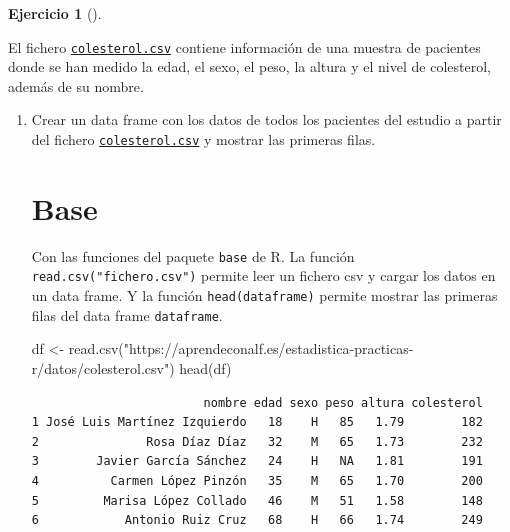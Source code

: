 \documentclass[
  spanish,
  a4paper,
]{scrreport}
\newenvironment{Shaded}{\begin{snugshade}}{\end{snugshade}}
\newcommand{\FunctionTok}[1]{\textcolor[rgb]{0.28,0.35,0.67}{#1}}
\newcommand{\NormalTok}[1]{\textcolor[rgb]{0.00,0.23,0.31}{#1}}
\newcommand{\OtherTok}[1]{\textcolor[rgb]{0.00,0.23,0.31}{#1}}
\newcommand{\StringTok}[1]{\textcolor[rgb]{0.13,0.47,0.30}{#1}}
\theoremstyle{definition}
\newtheorem{exercise}{Ejercicio}[chapter]
\theoremstyle{remark}
\begin{document}
\begin{exercise}[]\protect\hypertarget{exr-dataframes-2}{}\label{exr-dataframes-2}

El fichero \href{datos/colesterol.csv}{\texttt{colesterol.csv}} contiene
información de una muestra de pacientes donde se han medido la edad, el
sexo, el peso, la altura y el nivel de colesterol, además de su nombre.

\begin{enumerate}
\def\labelenumi{\alph{enumi}.}
\item
  Crear un data frame con los datos de todos los pacientes del estudio a
  partir del fichero
  \href{datos/colesterol.csv}{\texttt{colesterol.csv}} y mostrar las
  primeras filas.

  \begin{tcolorbox}[enhanced jigsaw, colback=white, opacityback=0, title=\textcolor{quarto-callout-tip-color}{\faLightbulb}\hspace{0.5em}{Solución}, toprule=.15mm, titlerule=0mm, breakable, toptitle=1mm, colframe=quarto-callout-tip-color-frame, coltitle=black, opacitybacktitle=0.6, bottomrule=.15mm, arc=.35mm, colbacktitle=quarto-callout-tip-color!10!white, leftrule=.75mm, bottomtitle=1mm, rightrule=.15mm, left=2mm]

  \section{Base}

  Con las funciones del paquete \texttt{base} de R. La función
  \texttt{read.csv("fichero.csv")} permite leer un fichero csv y cargar
  los datos en un data frame. Y la función \texttt{head(dataframe)}
  permite mostrar las primeras filas del data frame \texttt{dataframe}.

\begin{Shaded}
\begin{Highlighting}[]
\NormalTok{df }\OtherTok{\textless{}{-}} \FunctionTok{read.csv}\NormalTok{(}\StringTok{"https://aprendeconalf.es/estadistica{-}practicas{-}r/datos/colesterol.csv"}\NormalTok{)}
\FunctionTok{head}\NormalTok{(df)}
\end{Highlighting}
\end{Shaded}

\begin{verbatim}
                        nombre edad sexo peso altura colesterol
1 José Luis Martínez Izquierdo   18    H   85   1.79        182
2               Rosa Díaz Díaz   32    M   65   1.73        232
3        Javier García Sánchez   24    H   NA   1.81        191
4          Carmen López Pinzón   35    M   65   1.70        200
5         Marisa López Collado   46    M   51   1.58        148
6            Antonio Ruiz Cruz   68    H   66   1.74        249
\end{verbatim}


\end{tcolorbox}
\end{enumerate}
\end{exercise}
\end{document}
